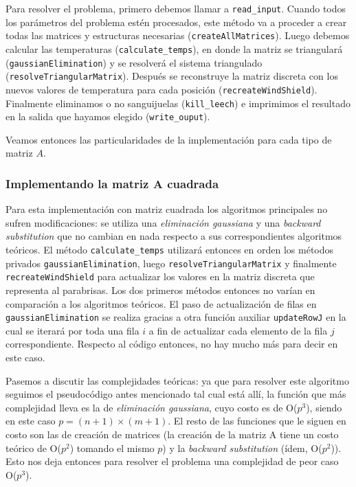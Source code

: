 \vspace{\baselineskip}

Para resolver el problema, primero debemos llamar a \texttt{read\_input}. Cuando todos los parámetros del problema estén procesados, este método va a proceder a crear todas las matrices y estructuras necesarias (\texttt{createAllMatrices}). Luego debemos calcular las temperaturas (\texttt{calculate\_temps}), en donde la matriz se triangulará (\texttt{gaussianElimination}) y se resolverá el sistema triangulado (\texttt{resolveTriangularMatrix}). Después se reconstruye la matriz discreta con los nuevos valores de temperatura para cada posición (\texttt{recreateWindShield}). Finalmente eliminamos o no sanguijuelas (\texttt{kill\_leech}) e imprimimos el resultado en la salida que hayamos elegido (\texttt{write\_ouput}).

Veamos entonces las particularidades de la implementación para cada tipo de matriz $A$.


\subsubsection{Implementando la matriz A cuadrada}

Para esta implementación con matriz cuadrada los algoritmos principales no sufren modificaciones: se utiliza una \textit{eliminación gaussiana} y una \textit{backward substitution} que no cambian en nada respecto a sus correspondientes algoritmos teóricos. El método \texttt{calculate\_temps} utilizará entonces en orden los métodos privados \texttt{gaussianElimination}, luego  \texttt{resolveTriangularMatrix} y finalmente \texttt{recreateWindShield} para actualizar los valores en la matriz discreta que representa al parabrisas. Los dos primeros métodos entonces no varían en comparación a los algoritmos teóricos. El paso de actualización de filas en \texttt{gaussianElimination} se realiza gracias a otra función auxiliar \texttt{updateRowJ} en la cual se iterará por toda una fila $i$ a fin de actualizar cada elemento de la fila $j$ correspondiente. Respecto al código entonces, no hay mucho más para decir en este caso.

\vspace{\baselineskip}

Pasemos a discutir las complejidades teóricas: ya que para resolver este algoritmo seguimos el pseudocódigo antes mencionado tal cual está allí, la función que más complejidad lleva es la de \textit{eliminación gaussiana}, cuyo costo es de O($p^3$), siendo en este caso $p = (n+1) \times (m+1)$. El resto de las funciones que le siguen en costo son las de creación de matrices (la creación de la matriz A tiene un costo teórico de O($p^2$) tomando el mismo $p$) y la \textit{backward substitution} (ídem, O($p^2$)). Esto nos deja entonces para resolver el problema una complejidad de peor caso O($p^3$).

